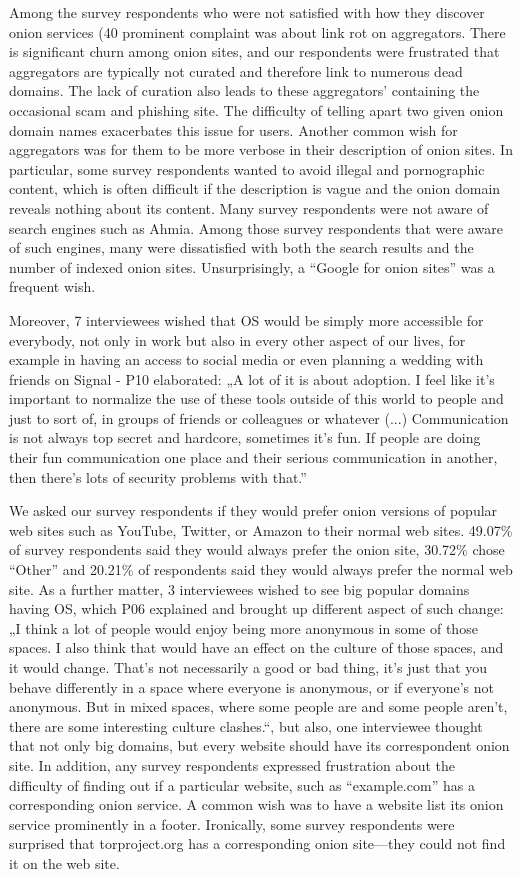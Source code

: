 Among the survey respondents who were not satisfied with how they discover onion services (40%
prominent complaint was about link rot on aggregators.  There is significant
churn among onion sites, and our respondents were frustrated that aggregators
are typically not curated and therefore link to numerous dead domains.  The lack
of curation also leads to these aggregators' containing the occasional scam and
phishing site.  The difficulty of telling apart two given onion domain names
exacerbates this issue for users.  Another common wish for aggregators was for
them to be more verbose in their description of onion sites.  In particular,
some survey respondents wanted to avoid illegal and pornographic content, which is often
difficult if the description is vague and the onion domain reveals nothing about
its content.  Many survey respondents were not aware of search engines such as Ahmia.
Among those survey respondents that were aware of such engines, many were dissatisfied with both the search results and
the number of indexed onion sites.  Unsurprisingly, a ``Google for onion sites''
was a frequent wish.


Moreover, 7 interviewees wished that OS would be simply more accessible for everybody, not only in work but also in every other aspect of our lives, for example in having an access to social media or even planning a wedding with friends on Signal - P10 elaborated: „A lot of it is about adoption. I feel like it's important to normalize the use of these tools outside of this world to people and just to sort of, in groups of friends or colleagues or whatever (...) Communication is not always top secret and hardcore, sometimes it's fun. If people are doing their fun communication one place and their serious communication in another, then there's lots of security problems with that.” 

We asked our survey respondents if they would prefer onion versions of popular web sites such as
YouTube, Twitter, or Amazon to their normal web
sites. 49.07\% of survey respondents said they
would always prefer the onion site, 30.72\% chose ``Other'' and 20.21\% of
respondents said they would always prefer the normal web site. As a further matter, 3 interviewees wished to see big popular domains having OS, which P06 explained and brought up different aspect of such change: „I think a lot of people would enjoy being more anonymous in some of those spaces. I also think that would have an effect on the culture of those spaces, and it would change. That's not necessarily a good or bad thing, it's just that you behave differently in a space where everyone is anonymous, or if everyone's not anonymous. But in mixed spaces, where some people are and some people aren't, there are some interesting culture clashes.“, but also, one interviewee thought that not only big domains, but every website should have its correspondent onion site. In addition, any survey respondents expressed frustration about the difficulty of finding out if a particular website, such as 
``example.com'' has a corresponding onion service.  A common wish was to have
a website list its onion service prominently in a footer.  Ironically, some
survey respondents were surprised that torproject.org has a corresponding onion
site---they could not find it on the web site.


